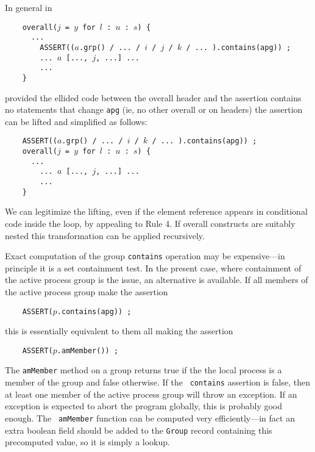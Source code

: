 \documentclass{article}
\begin{document}
In general in
\small
\begin{tabbing}
\verb$    overall($$j$\verb$ = $$y$\verb$ for $$l$\verb$ : $$u$\verb$ : $$s$\verb$) {$ \\
\verb$      ...$ \\
\verb$        ASSERT(($$a$\verb$.grp() / ... / $$i$\verb$ / $$j$\verb$ / $$k$\verb$ / ... ).contains(apg)) ;$ \\
\verb$        ... $$a$\verb$ [..., $$j$\verb$, ...] ...$ \\
\verb$        ...$ \\
\verb$    }$
\end{tabbing}
\normalsize
provided the ellided code between the overall header and the assertion
contains no statements that change {\tt apg} (ie, no other
overall or on headers) the assertion can be lifted and simplified as follows:
\small
\begin{tabbing}
\verb$    ASSERT(($$a$\verb$.grp() / ... / $$i$\verb$ / $$k$\verb$ / ... ).contains(apg)) ;$ \\
\verb$    overall($$j$\verb$ = $$y$\verb$ for $$l$\verb$ : $$u$\verb$ : $$s$\verb$) {$ \\
\verb$      ...$ \\
\verb$        ... $$a$\verb$ [..., $$j$\verb$, ...] ...$ \\
\verb$        ...$ \\
\verb$    }$
\end{tabbing}
\normalsize
We can legitimize the lifting, even if the element reference appears in
conditional code inside the loop, by appealing to Rule 4.  If overall
constructs are suitably nested this transformation can be applied
recursively.

Exact computation of the group {\tt contains} operation may be
expensive---in principle it is a set containment test.  
In the present case, where containment of the active process group is
the issue, an alternative is available.  If all members
of the active process group make the assertion
\small
\begin{tabbing}
\verb$    ASSERT($$p$\verb$.contains(apg)) ;$
\end{tabbing}
\normalsize
this is essentially equivalent to them all making the assertion
\small
\begin{tabbing}
\verb$    ASSERT($$p$\verb$.amMember()) ;$
\end{tabbing}
\normalsize
The {\tt amMember} method on a group returns true if the the local
process is a member of the group and false otherwise.  If the {\tt
contains} assertion is false, then at least one member of the active
process group will throw an exception.  If an exception is expected to
abort the program globally, this is probably good enough.  The {\tt
amMember} function can be computed very efficiently---in fact an extra
boolean field should be added to the {\tt Group} record containing this
precomputed value, so it is simply a lookup.
\end{document}
